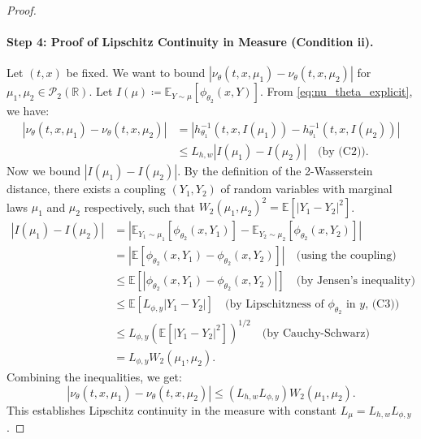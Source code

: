 \documentclass[qian]{imsart}
\newcommand{\R}{\mathbb{R}}
\newcommand{\E}{\mathbb{E}}
\newcommand{\Pcal}{\mathcal{P}}
\theoremstyle{plain}
\theoremstyle{definition}
\begin{document}
\begin{proof}
\paragraph{Step 4: Proof of Lipschitz Continuity in Measure (Condition ii).}
Let $(t,x)$ be fixed. We want to bound $|\nu_\theta(t, x, \mu_1) - \nu_\theta(t, x, \mu_2)|$ for $\mu_1, \mu_2 \in \Pcal_2(\R)$.
Let $I(\mu) \coloneqq \mathbb{E}_{Y \sim \mu}[\phi_{\theta_2}(x, Y)]$. From \eqref{eq:nu_theta_explicit}, we have:
\begin{align*}
    |\nu_\theta(t, x, \mu_1) - \nu_\theta(t, x, \mu_2)| &= |h_{\theta_1}^{-1}(t,x,I(\mu_1)) - h_{\theta_1}^{-1}(t,x,I(\mu_2))| \\
    &\le L_{h,w} |I(\mu_1) - I(\mu_2)| \quad \text{(by (C2))}.
\end{align*}
Now we bound $|I(\mu_1) - I(\mu_2)|$. By the definition of the 2-Wasserstein distance, there exists a coupling $(Y_1, Y_2)$ of random variables with marginal laws $\mu_1$ and $\mu_2$ respectively, such that $W_2(\mu_1, \mu_2)^2 = \E[|Y_1-Y_2|^2]$.
\begin{align*}
    |I(\mu_1) - I(\mu_2)| &= |\E_{Y_1 \sim \mu_1}[\phi_{\theta_2}(x, Y_1)] - \E_{Y_2 \sim \mu_2}[\phi_{\theta_2}(x, Y_2)]| \\
    &= |\E[\phi_{\theta_2}(x, Y_1) - \phi_{\theta_2}(x, Y_2)]| \quad \text{(using the coupling)} \\
    &\le \E[|\phi_{\theta_2}(x, Y_1) - \phi_{\theta_2}(x, Y_2)|] \quad \text{(by Jensen's inequality)} \\
    &\le \E[L_{\phi,y}|Y_1 - Y_2|] \quad \text{(by Lipschitzness of $\phi_{\theta_2}$ in $y$, (C3))} \\
    &\le L_{\phi,y} \left( \E[|Y_1 - Y_2|^2] \right)^{1/2} \quad \text{(by Cauchy-Schwarz)} \\
    &= L_{\phi,y} W_2(\mu_1, \mu_2).
\end{align*}
Combining the inequalities, we get:
\[ |\nu_\theta(t, x, \mu_1) - \nu_\theta(t, x, \mu_2)| \le (L_{h,w} L_{\phi,y}) W_2(\mu_1, \mu_2). \]
This establishes Lipschitz continuity in the measure with constant $L_\mu = L_{h,w} L_{\phi,y}$.


\end{proof}
\end{document}
